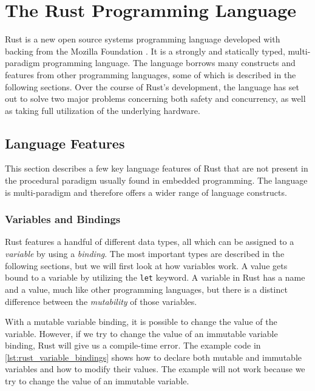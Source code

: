 
\section{The Rust Programming Language} %
\label{sub:the_rust_programming_language}

Rust \cite{web:rust_lang} is a new open source systems programming language developed with backing from the Mozilla Foundation \cite{web:mozilla_foundation}.
It is a strongly and statically typed, multi-paradigm programming language.
The language borrows many constructs and features from other programming languages, some of which is described in the following sections.
Over the course of Rust's development, the language has set out to solve two major problems concerning both safety and concurrency, as well as taking full utilization of the underlying hardware.

\subsection{Language Features}
\label{ssub:rust:features}

This section describes a few key language features of Rust that are not present in the procedural paradigm usually found in embedded programming.
The language is multi-paradigm and therefore offers a wider range of language constructs.

\subsubsection{Variables and Bindings}

Rust features a handful of different data types, all which can be assigned to a \emph{variable} by using a \emph{binding}.
The most important types are described in the following sections, but we will first look at how variables work.
A value gets bound to a variable by utilizing the \texttt{let} keyword.
A variable in Rust has a name and a value, much like other programming languages, but there is a distinct difference between the \emph{mutability} of those variables.

With a mutable variable binding, it is possible to change the value of the variable.
However, if we try to change the value of an immutable variable binding, Rust will give us a compile-time error.
The example code in \autoref{lst:rust_variable_bindings} shows how to declare both mutable and immutable variables and how to modify their values.
The example will not work because we try to change the value of an immutable variable.

